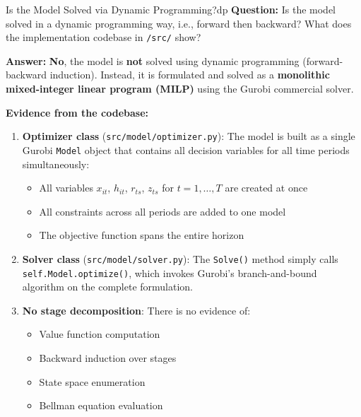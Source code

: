 \documentclass[11pt,a4paper]{article}
\begin{document}
\begin{questionbox}{Is the Model Solved via Dynamic Programming?}{dp}
\textbf{Question:} Is the model solved in a dynamic programming way, i.e., forward then backward? What does the implementation codebase in \texttt{/src/} show?

\textbf{Answer:} \textbf{No}, the model is \textbf{not} solved using dynamic programming (forward-backward induction). Instead, it is formulated and solved as a \textbf{monolithic mixed-integer linear program (MILP)} using the Gurobi commercial solver.

\textbf{Evidence from the codebase:}
\begin{enumerate}
    \item \textbf{Optimizer class} (\texttt{src/model/optimizer.py}): The model is built as a single Gurobi \texttt{Model} object that contains all decision variables for all time periods simultaneously:
    \begin{itemize}
        \item All variables $x_{it}$, $h_{it}$, $r_{ts}$, $z_{ts}$ for $t = 1, \ldots, T$ are created at once
        \item All constraints across all periods are added to one model
        \item The objective function spans the entire horizon
    \end{itemize}
    
    \item \textbf{Solver class} (\texttt{src/model/solver.py}): The \texttt{Solve()} method simply calls \texttt{self.Model.optimize()}, which invokes Gurobi's branch-and-bound algorithm on the complete formulation.
    
    \item \textbf{No stage decomposition}: There is no evidence of:
    \begin{itemize}
        \item Value function computation
        \item Backward induction over stages
        \item State space enumeration
        \item Bellman equation evaluation
    \end{itemize}
\end{enumerate}


\end{questionbox}
\end{document}
